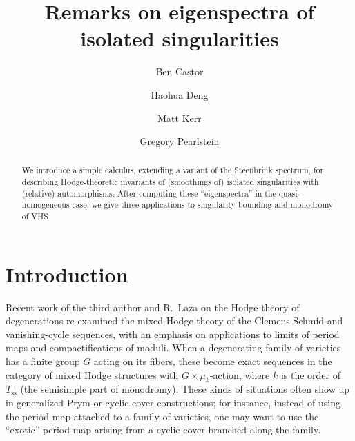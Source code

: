 \documentclass[12pt,letterpaper,english]{amsart}
\numberwithin{equation}{section}
\numberwithin{figure}{section}
\theoremstyle{plain}
\theoremstyle{remark}
\theoremstyle{definition}
\theoremstyle{definition}
\theoremstyle{plain}
\theoremstyle{plain}
\theoremstyle{plain}
\theoremstyle{plain}
\theoremstyle{definition}
\theoremstyle{definition}
\begin{document}
\title{Remarks on eigenspectra of isolated singularities}

\author[B. Castor]{Ben Castor}
\address{Department of Mathematics, Kenyon College, Gambier, OH}

\author[H. Deng]{Haohua Deng}
\address{Mathematics Department, Duke University, Durham, NC}

\author[M. Kerr]{Matt Kerr}
\address{Washington University in St.~Louis, Department of Mathematics and Statistics, St.~Louis, MO}

\author[G. Pearlstein]{Gregory Pearlstein}
\address{Dipartimento di Matematica, Universit\`a di Pisa, Pisa, Italy}

\begin{abstract}
We introduce a simple calculus, extending a variant of the Steenbrink spectrum, for describing Hodge-theoretic invariants of (smoothings of) isolated singularities with (relative) automorphisms.  After computing these ``eigenspectra'' in the quasi-homogeneous case, we give three applications to singularity bounding and monodromy of VHS.
\end{abstract}
\maketitle

\section*{Introduction}\label{S1}

Recent work of the third author and R.~Laza on the Hodge theory of degenerations \cite{KL1,KL2} re-examined the mixed Hodge theory of the Clemens-Schmid and vanishing-cycle sequences, with an emphasis on applications to limits of period maps and compactifications of moduli.  When a degenerating family of varieties has a finite group $G$ acting on its fibers, these become exact sequences in the category of mixed Hodge structures with $G\times\mu_k$-action, where $k$ is the order of $T_{\mathrm{ss}}$ (the semisimple part of monodromy).  These kinds of situations often show up in generalized Prym or cyclic-cover constructions; for instance, instead of using the period map attached to a family of varieties, one may want to use the ``exotic'' period map arising from a cyclic cover branched along the family.
 
\end{document}
